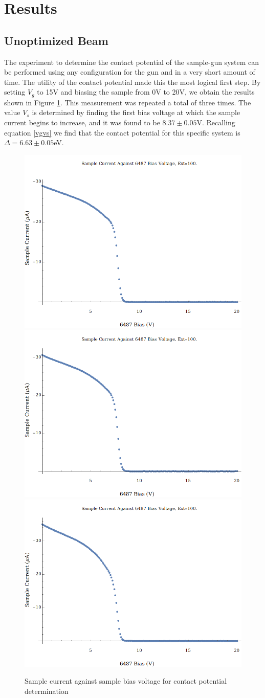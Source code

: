 \section{Results}

\subsection{Unoptimized Beam}

The experiment to determine the contact potential of the sample-gun system can be performed using any configuration for the gun and in a very short 
amount of time. The utility of the contact potential made this the most logical first step. By setting $V_g$ to 15V and biasing the sample 
from 0V to 20V, we obtain the results shown in Figure \ref{fig:contact}. This measurement was repeated a total of three times. 
The value $V_s$ is determined by finding the first bias voltage at which the sample current begins to increase, and it was found to be 
$8.37\pm0.05$V. Recalling equation \eqref{vgvs} we find that the contact potential for this specific system is $\Delta = 6.63\pm0.05$eV.

\begin{figure}[h!]
	\includegraphics[width=0.32\linewidth]{../Test Scans/GunResPlots/Plot1_Ext100.GunResTest.png}
	\includegraphics[width=0.32\linewidth]{../Test Scans/GunResPlots/Plot2_Ext100.GunResTest.png}
	\includegraphics[width=0.32\linewidth]{../Test Scans/GunResPlots/Plot3_Ext100.GunResTest.png}
	\caption{Sample current against sample bias voltage for contact potential determination}
	\label{fig:contact}
\end{figure}

